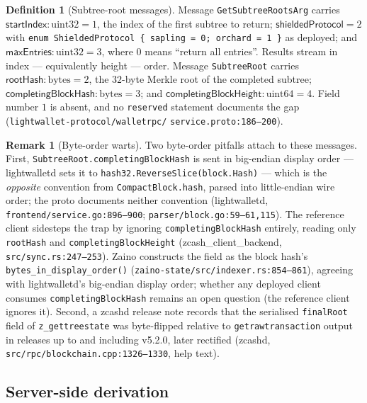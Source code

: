 \documentclass[11pt,a4paper]{article}
\theoremstyle{definition}
\newtheorem{definition}[theorem]{Definition}
\newtheorem{remark}[theorem]{Remark}
\begin{document}
\begin{definition}[Subtree-root messages]\label{def:sync-subtreeroot}
Message \texttt{GetSubtreeRootsArg} carries
$\mathsf{startIndex} : \text{uint32} = 1$, the index of the first subtree
to return; $\mathsf{shieldedProtocol} = 2$ with
\texttt{enum ShieldedProtocol \{ sapling = 0; orchard = 1 \}} as
deployed; and $\mathsf{maxEntries} : \text{uint32} = 3$, where $0$ means
``return all entries''. Results stream in index --- equivalently height
--- order. Message \texttt{SubtreeRoot} carries
$\mathsf{rootHash} : \text{bytes} = 2$, the $32$-byte Merkle root of the
completed subtree; $\mathsf{completingBlockHash} : \text{bytes} = 3$; and
$\mathsf{completingBlockHeight} : \text{uint64} = 4$. Field number $1$ is
absent, and no \texttt{reserved} statement documents the gap
(\texttt{lightwallet-protocol/walletrpc/}\allowbreak
\texttt{service.proto:186--200}).
\end{definition}

\begin{remark}[Byte-order warts]\label{rem:sync-tree-byteorder}
Two byte-order pitfalls attach to these messages. First,
\texttt{SubtreeRoot.completingBlockHash} is sent in big-endian display
order --- \textsf{lightwalletd} sets it to
\texttt{hash32.ReverseSlice(block.Hash)} --- which is the \emph{opposite}
convention from \texttt{CompactBlock.hash}, parsed into little-endian
wire order; the proto documents neither convention
(\textsf{lightwalletd}, \texttt{frontend/service.go:896--900};
\texttt{parser/block.go:59--61,115}). The reference client sidesteps the
trap by ignoring \texttt{completingBlockHash} entirely, reading only
\texttt{rootHash} and \texttt{completingBlockHeight}
(\textsf{zcash\_client\_backend}, \texttt{src/sync.rs:247--253}).
Zaino constructs the field as the block hash's
\texttt{bytes\_in\_display\_order()}
(\texttt{zaino-state/src/}\allowbreak\texttt{indexer.rs:854--861}),
agreeing with
\textsf{lightwalletd}'s big-endian display order; whether any deployed
client consumes \texttt{completingBlockHash} remains an open question
(the reference client ignores it).
Second, a \textsf{zcashd} release note records that the serialised
\texttt{finalRoot} field of \texttt{z\_gettreestate} was byte-flipped
relative to \texttt{getrawtransaction} output in releases up to and
including v5.2.0, later rectified
(\textsf{zcashd}, \texttt{src/rpc/blockchain.cpp:1326--1330}, help text).
\end{remark}

\subsection{Server-side derivation}\label{sec:sync-tree-server}
\end{document}
